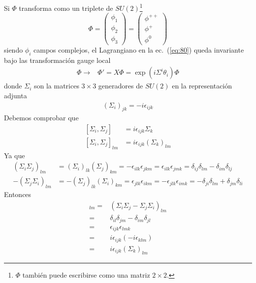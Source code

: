 Si $\Phi$ transforma como un triplete de $SU(2)$\footnote{$\Phi$ tambi\'en puede escribirse como una matriz $2\times2$.}
\begin{equation}
  \Phi=  \begin{pmatrix}
    \phi_1\\
    \phi_2\\
    \phi_3    
  \end{pmatrix}=
  \begin{pmatrix}
    \phi^{++}\\
    \phi^+\\
    \phi^0    
  \end{pmatrix}
\end{equation}
siendo $\phi_i$ campos complejos, el Lagrangiano en la ec.~(\ref{eq:80}) queda invariante bajo las transformaci\'on gauge local
\begin{align}
  \label{eq:168}
  \Phi\to&\Phi'=X\Phi=\exp(i{\Sigma^i}\theta_i)\Phi
\end{align}
donde $\Sigma_i$ son la matrices $3\times3$ generadores de $SU(2)$ en la representaci\'on adjunta
\begin{align}
  (\Sigma_i)_{jk}=-i\epsilon_{ijk}
\end{align}
Debemos comprobar que
\begin{align}
  \left[{\Sigma_i},{\Sigma_j}\right]&=i\epsilon_{ijk}{\Sigma_k}\nonumber\\
  \left[{\Sigma_i},{\Sigma_j}\right]_{lm}&=i\epsilon_{ijk}(\Sigma_k)_{lm}
\end{align}
Ya que
\begin{align}
  \label{eq:167}
  (\Sigma_i\Sigma_j)_{lm}&=(\Sigma_i)_{lk}(\Sigma_j)_{km}=-\epsilon_{ilk}\epsilon_{jkm}=\epsilon_{ilk}\epsilon_{jmk}=\delta_{ij}\delta_{lm}-\delta_{im}\delta_{lj}\nonumber\\
  -(\Sigma_j\Sigma_i)_{lm}&=-(\Sigma_j)_{lk}(\Sigma_i)_{km}=\epsilon_{jlk}\epsilon_{ikm}=-\epsilon_{jlk}\epsilon_{imk}=-\delta_{ji}\delta_{lm}+\delta_{jm}\delta_{li}
\end{align}
Entonces
\begin{align}
[\Sigma_i,\Sigma_j]_{lm}=& (\Sigma_i\Sigma_j-\Sigma_j\Sigma_i)_{lm}\nonumber\\
=&\delta_{il}\delta_{jm}-\delta_{im}\delta_{jl}\nonumber\\
=&\epsilon_{ijk}\epsilon_{lmk}\nonumber\\
=&i\epsilon_{ijk}(-i\epsilon_{klm})\nonumber\\
=&i\epsilon_{ijk}(\Sigma_k)_{lm}
\end{align}
